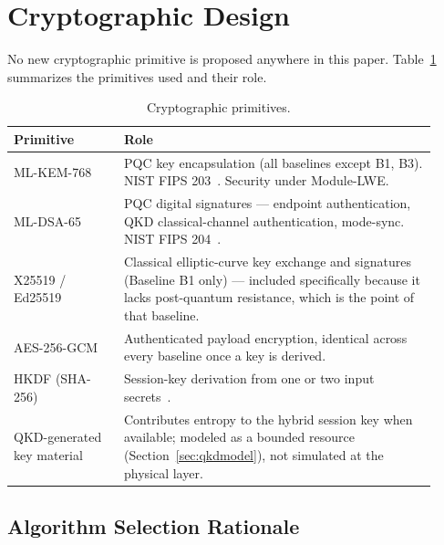 \documentclass[journal]{IEEEtran}
\begin{document}
\section{Cryptographic Design}
\label{sec:crypto}

No new cryptographic primitive is proposed anywhere in this paper. Table~\ref{tab:crypto} summarizes the primitives used and their role.

\begin{table}[t]
\centering
\caption{Cryptographic primitives.}
\label{tab:crypto}
\small
\begin{tabular}{@{}p{0.24\linewidth}p{0.68\linewidth}@{}}
\toprule
Primitive & Role \\
\midrule
ML-KEM-768 & PQC key encapsulation (all baselines except B1, B3). NIST FIPS 203~\cite{nist2024fips203}. Security under Module-LWE. \\
ML-DSA-65 & PQC digital signatures --- endpoint authentication, QKD classical-channel authentication, mode-sync. NIST FIPS 204~\cite{nist2024fips204}. \\
X25519 / Ed25519 & Classical elliptic-curve key exchange and signatures (Baseline B1 only) --- included specifically because it lacks post-quantum resistance, which is the point of that baseline. \\
AES-256-GCM & Authenticated payload encryption, identical across every baseline once a key is derived. \\
HKDF (SHA-256) & Session-key derivation from one or two input secrets~\cite{krawczyk2010hkdf}. \\
QKD-generated key material & Contributes entropy to the hybrid session key when available; modeled as a bounded resource (Section~\ref{sec:qkdmodel}), not simulated at the physical layer. \\
\bottomrule
\end{tabular}
\end{table}

\subsection{Algorithm Selection Rationale}
\end{document}

